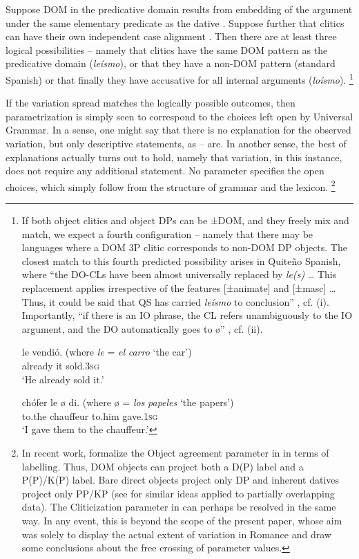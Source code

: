 \documentclass[output=paper,colorlinks,citecolor=brown,modfonts,nonflat]{langsci/langscibook}
\begin{document}
Suppose DOM in the predicative domain results from embedding of the argument under the same elementary predicate as the dative . Suppose further that clitics can have their own independent case alignment . Then there are at least three logical possibilities – namely that clitics have the same DOM pattern as the predicative domain (\textit{leísmo}), or that they have a non-DOM pattern (standard Spanish) or that finally they have accusative for all internal arguments (\textit{loísmo}).{} \footnote{If both object clitics and object DPs can be ±DOM, and they freely mix and match, we expect a fourth configuration – namely that there may be languages where a DOM 3P clitic corresponds to non-DOM DP objects. The closest match to this fourth predicted possibility arises in Quiteño Spanish, where “the DO-CLs have been almost universally replaced by \textit{le(s)} … This replacement applies irrespective of the features [±animate] and [±masc] …Thus, it could be said that QS has carried \textit{leísmo} to conclusion” \citep[387--388]{Suñer1989}, cf. (i). Importantly, “if there is an IO phrase, the CL refers unambiguously to the IO argument, and the DO automatically goes to ø” \citep[389]{Suñer1989}, cf. (ii).

\ea%

     {le}   {vendió}.   \hfill (where \textit{le} {=} \textit{el} \textit{carro} ‘the car’)\\
        already   it   sold\textsc{.3sg}\\
    \glt ‘He already sold it.’
\z

\ea%

     {chófer}  {le}   {ø} {di}.   \hfill (where {ø} = \textit{los} \textit{papeles} ‘the papers’)\\
        to.the chauffeur   to.him   {} gave.\textsc{1sg}\\
    \glt ‘I gave them to the chauffeur.’
\zlast}

If the variation spread matches the logically possible outcomes, then parametri\-za\-tion is simply seen to correspond to the choices left open by Universal Grammar. In a sense, one might say that there is no explanation for the observed variation, but only descriptive statements, as -- are. In another sense, the best of explanations actually turns out to hold, namely that variation, in this instance, does not require any additional statement. No parameter specifies the open choices, which simply follow from the structure of grammar and the lexicon.{} \footnote{In recent work, \citet{ManziniFranco2019} formalize the Object agreement parameter in  in terms of labelling. Thus, DOM objects can project both a D(P) label and a P(P)/K(P) label. Bare direct objects project only DP and inherent datives project only PP/KP (see  for similar ideas applied to partially overlapping data). The Cliticization parameter in  can perhaps be resolved in the same way. In any event, this is beyond the scope of the present paper, whose aim was solely to display the actual extent of variation in Romance and draw some conclusions about the free crossing of parameter values.}
\end{document}
